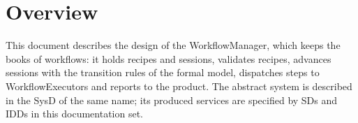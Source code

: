 \documentclass[a4paper]{arrowhead}
\begin{document}

\ArrowheadSetup

\begin{center}
  \vspace*{1cm}
  \huge{\arrowtitle}

  \vspace*{0.2cm}
  \LARGE{\arrowtype}
  \vspace*{1cm}

  
  \vspace*{\fill}

  

  \vspace*{1cm}
  \vspace*{\fill}

  \begin{abstract}
    This document describes how the WorkflowManager is implemented in the Java reference implementation: its internal components, the realisation of its functional and non-functional properties, its configuration and the implementation status of the other languages. Documentation edition 5.4.0.
  \end{abstract}

  \vspace*{1cm}
\end{center}

\newpage

\tableofcontents
\newpage

\section{Overview}
\label{sec:overview}
This document describes the design of the WorkflowManager, which keeps the books of workflows: it holds recipes and sessions, validates recipes, advances sessions with the transition rules of the formal model, dispatches steps to WorkflowExecutors and reports to the product. The abstract system is described in the
SysD of the same name; its produced services are specified by SDs and IDDs in this documentation set.
\end{document}

